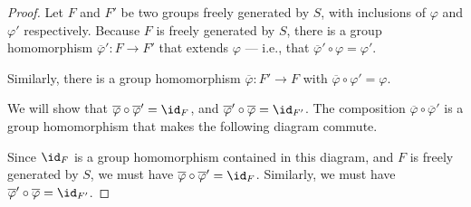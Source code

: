 \documentclass[10pt]{mypackage}
\begin{document}
\begin{proof}
  Let $F$ and $F'$ be two groups freely generated by $S$, with inclusions of $\varphi$ and $\varphi'$ respectively.
    Because $F$ is freely generated by $S$, there is a group homomorphism $\overline{\varphi}': F\rightarrow F'$ that extends $\varphi$ --- i.e., that $\overline{\varphi}' \circ \varphi = \varphi'$.\newline

      Similarly, there is a group homomorphism $\overline{\varphi}: F'\rightarrow F$ with $\overline{\varphi}\circ \varphi' = \varphi$.
      \begin{center}
      \end{center}
      We will show that $\overline{\varphi}\circ \overline{\varphi}' = \id_{F}$, and $\overline{\varphi}'\circ \overline{\varphi} = \id_{F'}$. The composition $\overline{\varphi}\circ \overline{\varphi}'$ is a group homomorphism that makes the following diagram commute.
      \begin{center}
      \end{center}
      Since $\id_{F}$ is a group homomorphism contained in this diagram, and $F$ is freely generated by $S$, we must have $\overline{\varphi}\circ \overline{\varphi}' = \id_{F}$. Similarly, we must have $\overline{\varphi}' \circ \overline{\varphi} = \id_{F'}$.
\end{proof}
\end{document}
